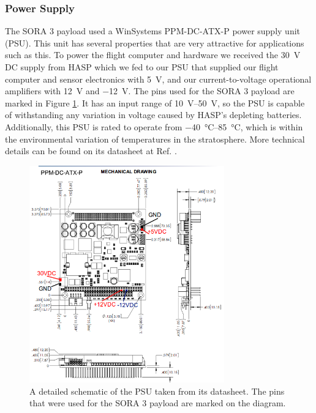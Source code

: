 \subsubsection{Power Supply}
The SORA 3 payload used a WinSystems PPM-DC-ATX-P power supply unit (PSU).
This unit has several properties that are very attractive for applications such as this. 
To power the flight computer and hardware we received the \SI{30}{\volt} DC supply from HASP which we fed to our PSU that supplied our flight computer and sensor electronics with \SI{+5}{\volt}, and our current-to-voltage operational amplifiers with \SI{+12}{\volt} and \SI{-12}{\volt}.
The pins used for the SORA 3 payload are marked in Figure \ref{fig:psu-outputs}.
It has an input range of \SIrange{10}{50}{\volt}, so the PSU is capable of withstanding any variation in voltage caused by HASP's depleting batteries.
Additionally, this PSU is rated to operate from \SIrange{-40}{85}{\celsius}, which is within the environmental variation of temperatures in the stratosphere.
More technical details can be found on its datasheet at Ref. \cite{WinSystems-PSU}.

\begin{figure}[h!]
	\begin{center}
		\includegraphics[width=0.75\textwidth]{figures/psu-pins.png}
		\caption{A detailed schematic of the PSU taken from its datasheet. The pins that were used for the SORA 3 payload are marked on the diagram.}
		\label{fig:psu-outputs}
	\end{center}
\end{figure}

